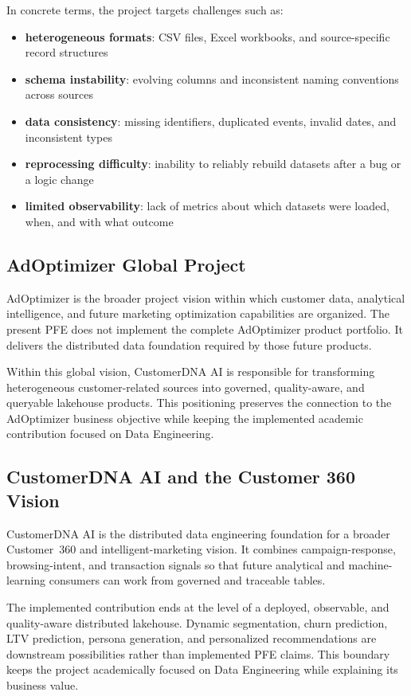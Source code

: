 In concrete terms, the project targets challenges such as:
\begin{itemize}
    \item \textbf{heterogeneous formats}: CSV files, Excel workbooks, and source-specific record structures
    \item \textbf{schema instability}: evolving columns and inconsistent naming conventions across sources
    \item \textbf{data consistency}: missing identifiers, duplicated events, invalid dates, and inconsistent types
    \item \textbf{reprocessing difficulty}: inability to reliably rebuild datasets after a bug or a logic change
    \item \textbf{limited observability}: lack of metrics about which datasets were loaded, when, and with what outcome
\end{itemize}

\subsection{AdOptimizer Global Project}
AdOptimizer is the broader project vision within which customer data, analytical intelligence, and future marketing optimization capabilities are organized. The present PFE does not implement the complete AdOptimizer product portfolio. It delivers the distributed data foundation required by those future products.

Within this global vision, CustomerDNA AI is responsible for transforming heterogeneous customer-related sources into governed, quality-aware, and queryable lakehouse products. This positioning preserves the connection to the AdOptimizer business objective while keeping the implemented academic contribution focused on Data Engineering.

\subsection{CustomerDNA AI and the Customer 360 Vision}
CustomerDNA AI is the distributed data engineering foundation for a broader Customer~360 and intelligent-marketing vision. It combines campaign-response, browsing-intent, and transaction signals so that future analytical and machine-learning consumers can work from governed and traceable tables.

The implemented contribution ends at the level of a deployed, observable, and quality-aware distributed lakehouse. Dynamic segmentation, churn prediction, LTV prediction, persona generation, and personalized recommendations are downstream possibilities rather than implemented PFE claims. This boundary keeps the project academically focused on Data Engineering while explaining its business value.

